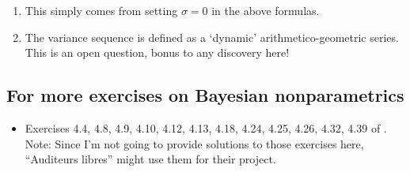 \documentclass{article}
\begin{document}
{\begin{enumerate}
\begin{align}
&= \frac{\mathbb{E}[K_n]\sigma (n- \alpha ) + n \alpha - \sigma^2 (\mathbb{E}[K_n]^2 +  \mbox{Var}(K_n))}{(n+\alpha)^2},\label{eq: var 1st}
\end{align}
while \eqref{eq: exp_PY_rec} provides for second term of the right-hand side of \eqref{eq:var} 
 \begin{equation}\label{eq: var 2nd}
\mbox{Var}(\mathbb{E}[K_{n+1}\mid K_1,\ldots,K_{n}=K])=\left( \frac{\sigma + n + \alpha}{n+\alpha}\right)^2 \mbox{Var}(K_n).
\end{equation}
Then combining \eqref{eq: var 1st} and \eqref{eq: var 2nd},  the following recursive formula holds
\begin{align}\label{eq:s2-recursive}
 \mbox{Var}(K_{n+1}) &= \mbox{Var}(K_n)\frac{n + \alpha + 2\sigma}{n+\alpha} + \frac{\sigma\mathbb{E}[K_n](n - \alpha - \sigma\mathbb{E}[K_n]) + n \alpha}{(n+\alpha)^2}\nonumber\\
 &= \mbox{Var}(K_n)\frac{n + \alpha + 2\sigma}{n+\alpha} + \frac{(\sigma\mathbb{E}[K_n]+ \alpha)(n - \sigma\mathbb{E}[K_n])}{(n+\alpha)^2},
\end{align} 
which simplifies to the desired expression by using 
$\mathbb{E}[K_n] = \frac{\alpha}{\sigma}\left(\frac{(\alpha +\sigma)_{n}}{(\alpha)_{n}}-1\right)$.
\item This simply comes from setting $\sigma = 0$ in the above formulas.
\item The variance sequence is defined as a `dynamic' arithmetico-geometric series. This is an open question, bonus to any discovery here!
\end{enumerate}
}

\subsection{For more exercises on Bayesian nonparametrics}

\begin{itemize}
	\item Exercises 4.4, 4.8, 4.9, 4.10, 4.12, 4.13, 4.18, 4.24, 4.25, 4.26, 4.32, 4.39
of \cite{ghosal2017fundamentals}.\\
Note: Since I'm not going to provide solutions to those exercises here, ``Auditeurs libres'' might use them for their project.
\end{itemize}
\end{document}
